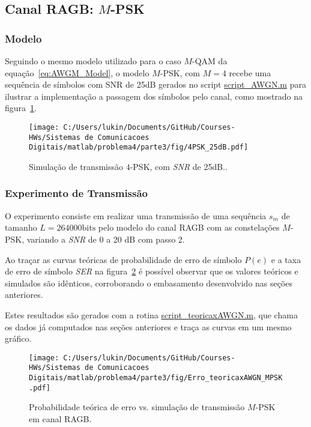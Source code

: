 \clearpage

\subsection{Canal RAGB: \texorpdfstring{$M$}{M}-PSK}
\subsubsection{Modelo}


Seguindo o mesmo modelo utilizado para o caso $M$-QAM da equação~\ref{eq:AWGM_Model}, o modelo $M$-PSK, com $M = 4$ recebe uma sequência de símbolos com SNR de 25dB gerados no script \href{https://raw.githubusercontent.com/lucasabdalah/Courses-HWs/SCD/Sistemas%20de%20Comunicacoes%20Digitais/matlab/problema4/parte3/script_AWGN.m}{\colorbox{gray!20}{\color{red} script\_AWGN.m}} para ilustrar a implementação a passagem dos símbolos pelo canal, como mostrado na figura~\ref{fig:4PSK_25dB}.

\begin{figure}[!ht]
    \centering
    \texttt{[image: C:/Users/lukin/Documents/GitHub/Courses-HWs/Sistemas de Comunicacoes Digitais/matlab/problema4/parte3/fig/4PSK\_25dB.pdf]}
    \caption{Simulação de transmissão $4$-PSK, com \textit{SNR} de 25dB..}
    \label{fig:4PSK_25dB}
\end{figure}

\subsubsection{Experimento de Transmissão}

 O experimento consiste em realizar uma transmissão de uma sequência $s_m$ de tamanho $L = 264000 \text{bits}$ pelo modelo do canal RAGB com as constelações $M$-PSK, variando a \textit{SNR} de 0 a 20 dB com passo 2.

Ao traçar as curvas teóricas de probabilidade de erro de símbolo $P(e)$ e a taxa de erro de símbolo \textit{SER} na figura~\ref{fig:Erro_teoricaxAWGN_MPSK} é possível observar que os valores teóricos e simulados são idênticos, corroborando o embasamento desenvolvido nas seções anteriores.

Estes resultados são gerados com a rotina \href{https://raw.githubusercontent.com/lucasabdalah/Courses-HWs/SCD/Sistemas%20de%20Comunicacoes%20Digitais/matlab/problema4/parte3/script_teoricaxAWGN.m}{\colorbox{gray!20}{\color{red} script\_teoricaxAWGN.m}}, que chama os dados já computados nas seções anteriores e traça as curvas em um mesmo gráfico.

\clearpage
\begin{figure}[!ht]
    \centering
    \texttt{[image: C:/Users/lukin/Documents/GitHub/Courses-HWs/Sistemas de Comunicacoes Digitais/matlab/problema4/parte3/fig/Erro\_teoricaxAWGN\_MPSK.pdf]}
    \caption{Probabilidade teórica de erro vs. simulação de transmissão $M$-PSK em canal RAGB.}
    \label{fig:Erro_teoricaxAWGN_MPSK}
\end{figure}
